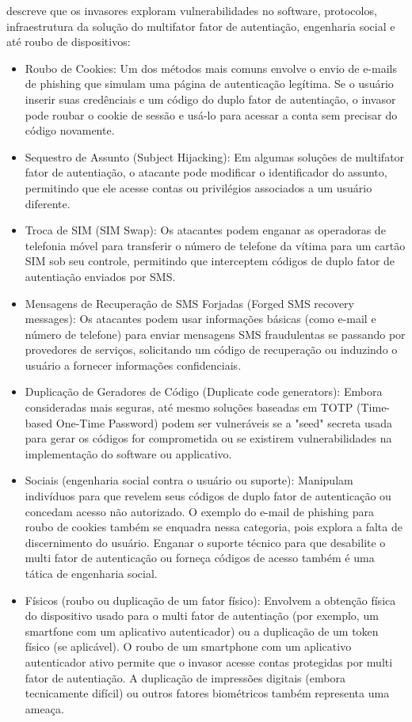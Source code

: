 \documentclass[12pt]{article}
\begin{document}
\cite{article:3} descreve que os invasores exploram vulnerabilidades no software, protocolos,
infraestrutura da solução do multifator fator de autentiação, engenharia social e até roubo
de dispositivos:
\begin{itemize}
  \item Roubo de Cookies: Um dos métodos mais comuns envolve o envio de e-mails de phishing
  que simulam uma página de autenticação legítima.
  Se o usuário inserir suas credênciais e um código do duplo fator de autentiação, o invasor
  pode roubar o cookie de sessão e usá-lo para acessar a conta sem precisar do código
  novamente.
  \item Sequestro de Assunto (Subject Hijacking): Em algumas soluções de multifator fator de
  autentiação, o atacante pode modificar o identificador do assunto, permitindo que ele
  acesse contas ou privilégios associados a um usuário diferente.
  \item Troca de SIM (SIM Swap): Os atacantes podem enganar as operadoras de telefonia móvel
  para transferir o número de telefone da vítima para um cartão SIM sob seu controle,
  permitindo que interceptem códigos de duplo fator de autentiação enviados por SMS.
  \item Mensagens de Recuperação de SMS Forjadas (Forged SMS recovery messages): Os
  atacantes podem usar informações básicas (como e-mail e número de telefone) para enviar
  mensagens SMS fraudulentas se passando por provedores de serviços, solicitando um código de
  recuperação ou induzindo o usuário a fornecer informações confidenciais.
  \item Duplicação de Geradores de Código (Duplicate code generators): Embora consideradas
  mais seguras, até mesmo soluções baseadas em TOTP (Time-based One-Time Password) podem ser
  vulneráveis se a "seed" secreta usada para gerar os códigos for comprometida ou se
  existirem vulnerabilidades na implementação do software ou  applicativo.
  \item Sociais (engenharia social contra o usuário ou suporte): Manipulam indivíduos para
  que revelem seus códigos de duplo fator de autenticação ou concedam acesso não autorizado.
  O exemplo do e-mail de phishing para roubo de cookies também se enquadra nessa categoria,
  pois explora a falta de discernimento do usuário.
  Enganar o suporte técnico para que desabilite o multi fator de autenticação ou forneça
  códigos de acesso também é uma tática de engenharia social.
  \item Físicos (roubo ou duplicação de um fator físico): Envolvem a obtenção física do
  dispositivo usado para o multi fator de autentiação (por exemplo, um smartfone com um
  aplicativo autenticador) ou a duplicação de um token físico (se aplicável).
  O roubo de um smartphone com um aplicativo autenticador ativo permite que o invasor acesse
  contas protegidas por multi fator de autentiação.
  A duplicação de impressões digitais (embora tecnicamente difícil) ou outros fatores
  biométricos também representa uma ameaça.
\end{itemize}
\end{document}

